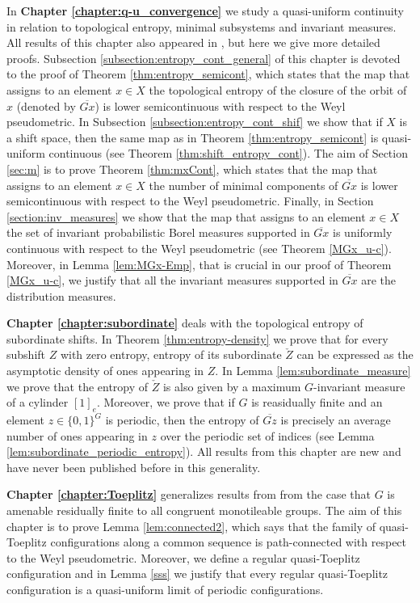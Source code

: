 In {\bf Chapter \ref{chapter:q-u_convergence}} we study a quasi-uniform continuity in relation to topological entropy, minimal subsystems and invariant measures. 
%
All results of  this chapter also appeared in \cite{LS18}, but here we give more detailed proofs.
%
Subsection \ref{subsection:entropy_cont_general} of this chapter is devoted to the proof of Theorem \ref{thm:entropy_semicont}, which states that the map that assigns to an element $x\in X$ the topological entropy of the closure of the orbit of $x$ (denoted by $\overline{Gx}$) is lower semicontinuous with respect to the Weyl pseudometric. 
%
In Subsection \ref{subsection:entropy_cont_shif} we show that if $X$ is a shift space, then the same map as in Theorem \ref{thm:entropy_semicont} is quasi-uniform continuous (see Theorem \ref{thm:shift_entropy_cont}).
%
The aim of Section \ref{sec:m} is to prove Theorem \ref{thm:mxCont}, which states that the map that assigns to an element $x\in X$ the number of minimal components of $\overline{Gx}$ is lower semicontinuous with respect to the Weyl pseudometric.
%
Finally, in Section \ref{section:inv_measures} we show that the map that assigns to an element $x\in X$ the set of invariant probabilistic Borel measures supported in $\overline{Gx}$ is uniformly continuous with respect to the Weyl pseudometric (see Theorem \ref{MGx_u-c}).
%
Moreover, in Lemma \ref{lem:MGx-Emp}, that is crucial in our proof of Theorem \ref{MGx_u-c}, we justify that all the invariant measures supported in $\overline{Gx}$ are the distribution measures.

{\bf Chapter \ref{chapter:subordinate}} deals with the topological entropy of subordinate shifts. In Theorem \ref{thm:entropy-density} we prove that for every subshift $Z$ with zero entropy, entropy of its subordinate $\check Z$ can be expressed as the asymptotic density of ones appearing in $Z$. 
%
In Lemma \ref{lem:subordinate_measure} we prove that the entropy of $\check Z$ is also given by a maximum $G$-invariant measure of a cylinder $[1]_e$. 
%
Moreover, we prove that if $G$ is reasidually finite and an element $z\in\{0,1\}^G$ is periodic, then the entropy of $\overline{Gz}$ is precisely an average number of ones appearing in $z$ over the periodic set of indices (see Lemma \ref{lem:subordinate_periodic_entropy}). 
%
All results from this chapter are new and have never been published before in this generality.

{\bf Chapter \ref{chapter:Toeplitz}} generalizes results from \cite{LS18} from the case that $G$ is amenable residually finite to all congruent monotileable groups. The aim of this chapter is to prove Lemma \ref{lem:connected2}, which says that the family of quasi-Toeplitz configurations along a common \Folner sequence is path-connected with respect to the Weyl pseudometric. Moreover, we define a regular quasi-Toeplitz configuration and in Lemma \ref{sss} we justify that every regular quasi-Toeplitz configuration is a quasi-uniform limit of periodic configurations.

